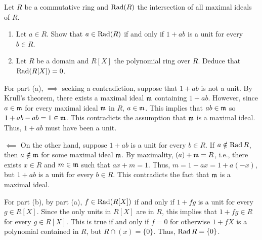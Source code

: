 \begin{problem}
  Let \(R\) be a commutative ring and \(\operatorname{Rad}(R)\) the intersection of all
  maximal ideals of \(R\).
  \begin{enumerate}[label=(\alph*)]
  \item Let \(a\in R\). Show that \(a\in\operatorname{Rad}(R)\) if and only if \(1+ab\)
    is a unit for every \(b\in R\).
  \item Let \(R\) be a domain and \(R[X]\) the polynomial ring over
    \(R\). Deduce that \(\operatorname{Rad}(R[X])=0\).
  \end{enumerate}
\end{problem}
\begin{solution}
  For part (a), \(\implies\) seeking a contradiction, suppose that \(1+ab\)
  is not a unit. By Krull's theorem, there exists a maximal ideal
  \(\mathfrak{m}\) containing \(1+ab\). However, since \(a\in\mathfrak{m}\) for every
  maximal ideal \(\mathfrak{m}\) in \(R\), \(a\in\mathfrak{m}\). This implies that
  \(ab\in\mathfrak{m}\) so \(1+ab-ab=1\in\mathfrak{m}\). This contradicts the
  assumption that \(\mathfrak{m}\) is a maximal ideal. Thus, \(1+ab\) must have
  been a unit.

  \(\impliedby\) On the other hand, suppose \(1+ab\) is a unit for every
  \(b\in R\). If \(a\notin\operatorname{Rad} R\), then \(a\notin\mathfrak{m}\) for some maximal
  ideal \(\mathfrak{m}\). By maximality, \((a)+\mathfrak{m}=R\), i.e., there exists
  \(x\in R\) and \(m\in\mathfrak{m}\) such that \(ax+m=1\). Thus,
  \(m=1-ax=1+a(-x)\), but \(1+ab\) is a unit for every \(b\in R\). This
  contradicts the fact that \(\mathfrak{m}\) is a maximal ideal.

  For part (b), by part (a), \(f\in\operatorname{Rad}(R[X])\) if and only if
  \(1+fg\) is a unit for every \(g\in R[X]\). Since the only units in
  \(R[X]\) are in \(R\), this implies that \(1+fg\in R\) for every \(g\in
  R[X]\). This is true if and only if \(f=0\) for otherwise \(1+fX\) is a
  polynomial contained in \(R\), but \(R\cap(x)=\{0\}\). Thus, \(\operatorname{Rad}
  R=\{0\}\).
\end{solution}


